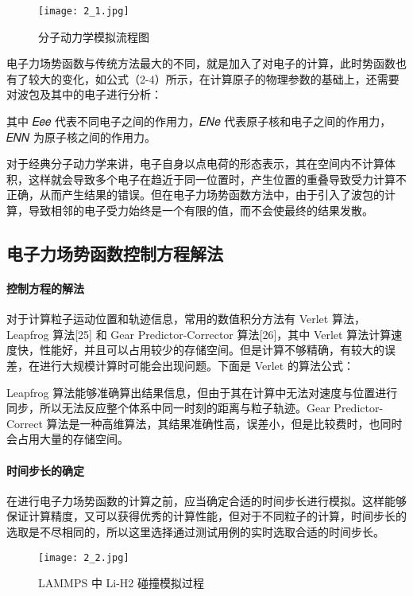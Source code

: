  \begin{figure}[h]
  \centering
  \texttt{[image: 2\_1.jpg]}
  \caption{分子动力学模拟流程图}
  \label{fig:badge}
\end{figure}

电子力场势函数与传统方法最大的不同，就是加入了对电子的计算，此时势函数也有了较大的变化，如公式（2-4）所示，在计算原子的物理参数的基础上，还需要对波包及其中的电子进行分析：

其中 𝐸𝑒𝑒 代表不同电子之间的作用力，𝐸𝑁𝑒 代表原子核和电子之间的作用力，𝐸𝑁𝑁 为原子核之间的作用力。

对于经典分子动力学来讲，电子自身以点电荷的形态表示，其在空间内不计算体积，这样就会导致多个电子在趋近于同一位置时，产生位置的重叠导致受力计算不正确，从而产生结果的错误。但在电子力场势函数方法中，由于引入了波包的计算，导致相邻的电子受力始终是一个有限的值，而不会使最终的结果发散。


\subsection{电子力场势函数控制方程解法}
\paragraph{控制方程的解法}
对于计算粒子运动位置和轨迹信息，常用的数值积分方法有 Verlet 算法， Leapfrog 算法[25] 和 Gear Predictor-Corrector 算法[26]，其中 Verlet 算法计算速度快，性能好，并且可以占用较少的存储空间。但是计算不够精确，有较大的误差，在进行大规模计算时可能会出现问题。下面是 Verlet 的算法公式：

Leapfrog 算法能够准确算出结果信息，但由于其在计算中无法对速度与位置进行同步，所以无法反应整个体系中同一时刻的距离与粒子轨迹。Gear Predictor-Correct 算法是一种高维算法，其结果准确性高，误差小，但是比较费时，也同时会占用大量的存储空间。

\paragraph{时间步长的确定}
在进行电子力场势函数的计算之前，应当确定合适的时间步长进行模拟。这样能够保证计算精度，又可以获得优秀的计算性能，但对于不同粒子的计算，时间步长的选取是不尽相同的，所以这里选择通过测试用例的实时选取合适的时间步长。

 \begin{figure}[h]
  \centering
  \texttt{[image: 2\_2.jpg]}
  \caption{LAMMPS 中 Li-H2 碰撞模拟过程}
  \label{fig:badge}
\end{figure}

